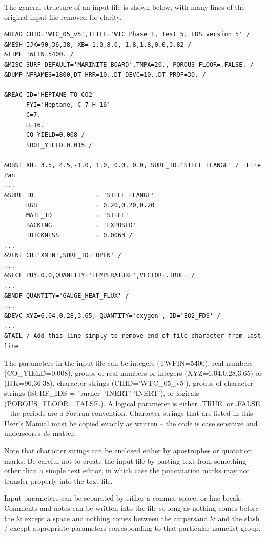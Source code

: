 \documentclass[11pt]{book}
\begin{document}
The general structure of an input file is shown below, with many
lines of the original input file removed for clarity.

\footnotesize
\begin{verbatim}
&HEAD CHID='WTC_05_v5',TITLE='WTC Phase 1, Test 5, FDS version 5' /
&MESH IJK=90,36,38, XB=-1.0,8.0,-1.8,1.8,0.0,3.82 /
&TIME TWFIN=5400. /
&MISC SURF_DEFAULT='MARINITE BOARD',TMPA=20., POROUS_FLOOR=.FALSE. /
&DUMP NFRAMES=1800,DT_HRR=10.,DT_DEVC=10.,DT_PROF=30. /

&REAC ID='HEPTANE TO CO2'
      FYI='Heptane, C_7 H_16'
      C=7.
      H=16.
      CO_YIELD=0.008 /
      SOOT_YIELD=0.015 /

&OBST XB= 3.5, 4.5,-1.0, 1.0, 0.0, 0.0, SURF_ID='STEEL FLANGE' /  Fire Pan
...
&SURF ID                 = 'STEEL FLANGE'
      RGB                = 0.20,0.20,0.20
      MATL_ID            = 'STEEL'
      BACKING            = 'EXPOSED'
      THICKNESS          = 0.0063 /
...
&VENT CB='XMIN',SURF_ID='OPEN' /
...
&SLCF PBY=0.0,QUANTITY='TEMPERATURE',VECTOR=.TRUE. /
...
&BNDF QUANTITY='GAUGE_HEAT_FLUX' /
...
&DEVC XYZ=6.04,0.28,3.65, QUANTITY='oxygen', ID='EO2_FDS' /
...
&TAIL / Add this line simply to remove end-of-file character from last line
\end{verbatim}
\normalsize

\noindent
The parameters in the input file can be integers ({\ct TWFIN=5400}),
real numbers ({\ct CO\_YIELD=0.008}), groups of real numbers or integers
({\ct XYZ=6.04,0.28,3.65}) or ({\ct IJK=90,36,38}),
character strings ({\ct CHID='WTC\_05\_v5'}), groups of character strings
({\ct SURF\_IDS = 'burner' 'INERT' 'INERT'}),
or logicals ({\ct POROUS\_FLOOR=.FALSE.}). A logical parameter is either
{\ct .TRUE.} or {\ct .FALSE.} -- the periods are a
Fortran convention. Character strings that are listed in
this User's Manual must be copied exactly as written -- the code
is case sensitive and underscores {\em do} matter.

\begin{warning}
\noindent
Note that character strings can be enclosed either by apostrophes or quotation marks.
Be careful not to create the input file by pasting text from something other than a
simple text editor, in which case the punctuation marks may not transfer
properly into the text file.
\end{warning}

Input parameters can be separated by either a comma, space, or line break.
Comments and notes can be written into the file so long as nothing comes
before the {\ct \&} except a space and nothing comes between the ampersand
{\ct \&} and the slash {\ct /} except appropriate parameters corresponding
to that particular namelist group.
\end{document}
